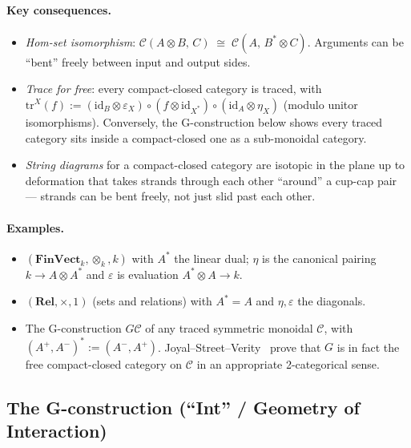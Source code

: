 \documentclass[11pt]{article}
\newcommand{\id}{\mathrm{id}}
\begin{document}
\paragraph{Key consequences.}
\begin{itemize}
  \item \emph{Hom-set isomorphism}:
        $\mathcal{C}(A \otimes B,\, C) \;\cong\; \mathcal{C}(A,\, B^* \otimes C)$.
        Arguments can be ``bent'' freely between input and output sides.
  \item \emph{Trace for free}: every compact-closed category is
        traced, with
        $\mathrm{tr}^X(f) :=
          (\id_B \otimes \varepsilon_X) \circ (f \otimes \id_{X^*}) \circ
          (\id_A \otimes \eta_X)$
        (modulo unitor isomorphisms).  Conversely, the G-construction
        below shows every traced category sits inside a compact-closed
        one as a sub-monoidal category.
  \item \emph{String diagrams} for a compact-closed category are
        isotopic in the plane up to deformation that takes strands
        through each other ``around'' a cup-cap pair --- strands can
        be bent freely, not just slid past each other.
\end{itemize}

\paragraph{Examples.}
\begin{itemize}
  \item $(\mathbf{FinVect}_k, \otimes_k, k)$ with $A^*$ the linear
        dual; $\eta$ is the canonical pairing $k \to A \otimes A^*$
        and $\varepsilon$ is evaluation $A^* \otimes A \to k$.
  \item $(\mathbf{Rel}, \times, 1)$ (sets and relations) with
        $A^* = A$ and $\eta, \varepsilon$ the diagonals.
  \item The G-construction $G\mathcal{C}$ of any traced symmetric
        monoidal $\mathcal{C}$, with $(A^+, A^-)^* := (A^-, A^+)$.
        Joyal--Street--Verity~\cite{JSV} prove that $G$ is in fact the
        free compact-closed category on $\mathcal{C}$ in an
        appropriate 2-categorical sense.
\end{itemize}

\subsection{The G-construction (``Int'' / Geometry of Interaction)}
\label{sec:gconstr}
\end{document}
